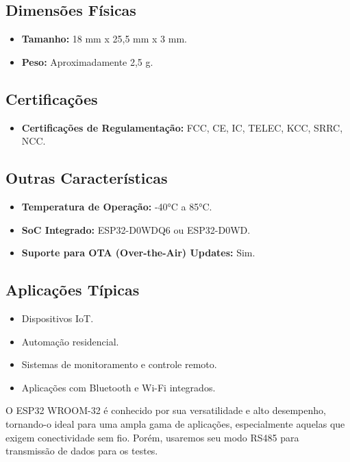 \subsection{Dimensões Físicas}
\begin{itemize}
    \item \textbf{Tamanho:} 18 mm x 25,5 mm x 3 mm.
    \item \textbf{Peso:} Aproximadamente 2,5 g.
\end{itemize}

\subsection{Certificações}
\begin{itemize}
    \item \textbf{Certificações de Regulamentação:} FCC, CE, IC, TELEC, KCC, SRRC, NCC.
\end{itemize}

\subsection{Outras Características}
\begin{itemize}
    \item \textbf{Temperatura de Operação:} -40°C a 85°C.
    \item \textbf{SoC Integrado:} ESP32-D0WDQ6 ou ESP32-D0WD.
    \item \textbf{Suporte para OTA (Over-the-Air) Updates:} Sim.
\end{itemize}

\subsection{Aplicações Típicas}
\begin{itemize}
    \item Dispositivos IoT.
    \item Automação residencial.
    \item Sistemas de monitoramento e controle remoto.
    \item Aplicações com Bluetooth e Wi-Fi integrados.
\end{itemize}

O ESP32 WROOM-32 é conhecido por sua versatilidade e alto desempenho, tornando-o ideal para uma ampla gama de aplicações, especialmente aquelas que exigem conectividade sem fio. Porém, usaremos seu modo RS485 para transmissão de dados para os testes.

